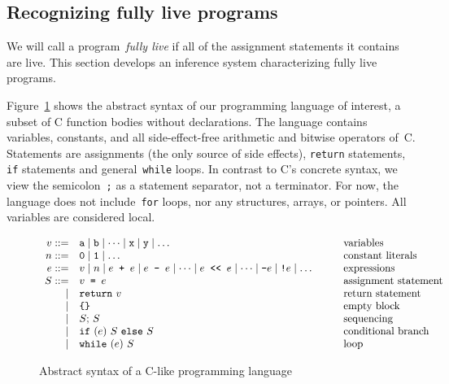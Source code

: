 \documentclass{llncs}
\begin{document}
\subsection{Recognizing fully live programs}

We will call a program~\emph{fully live} if all of the assignment statements
it contains are live. This section develops an inference system
characterizing fully live programs.

Figure~\ref{fig:syntax} shows the abstract syntax of our programming
language of interest, a subset of C function bodies without declarations.
The language contains variables, constants, and all side-effect-free
arithmetic and bitwise operators of~C. Statements are assignments (the only
source of side effects), \verb|return| statements, \verb|if| statements and
general~\verb|while| loops. In contrast to C's concrete syntax, we view the
semicolon~\verb|;| as a statement separator, not a terminator. For now, the
language does not include~\verb|for| loops, nor any structures, arrays, or
pointers. All variables are considered local.

\begin{figure}
\[
\begin{array}{rll}
v ::= &
    \mathtt{a} \mid \mathtt{b} \mid \dots \mid \mathtt{x} \mid \mathtt{y}
    \mid \dots &
    \mbox{variables} \\
n ::= & \mathtt{0} \mid \mathtt{1} \mid \dots & \mbox{constant literals} \\
e ::= &
    v \mid
    n \mid
    e \mbox{\texttt{ + }} e \mid e \mbox{\texttt{ - }} e \mid \dots
    \mid e \mbox{\texttt{ <{}< }} e \mid \dots \mid \mbox{\texttt{-}} e \mid
    \mbox{\texttt{!}} e
    \mid \dots \qquad &
    \mbox{expressions} \\
S ::=
    & v \mbox{\texttt{\ =\ }} e & \mbox{assignment statement} \\
\mid & \mathtt{return\ } v & \mbox{return statement} \\
\mid & \mbox{\texttt{\{\}}} & \mbox{empty block} \\
\mid & S \mathtt{;\ } S & \mbox{sequencing} \\
\mid & \mathtt{if\ (}e\mathtt{)\ } S \mathtt{\ else\ } S & \mbox{conditional branch} \\
\mid & \mathtt{while\ (}e\mathtt{)\ } S & \mbox{loop}
\end{array}
\]
\caption{Abstract syntax of a C-like programming language}
\label{fig:syntax}
\end{figure}
\end{document}
